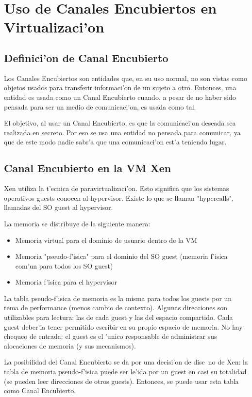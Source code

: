 \section{Uso de Canales Encubiertos en Virtualizaci'on}

\subsection{Definici'on de Canal Encubierto}

Los Canales Encubiertos son entidades que, en su uso normal, no son vistas como objetos usados para transferir informaci'on de un sujeto a otro. Entonces, una entidad es usada como un Canal Encubierto cuando, a pesar de no haber sido pensada para ser un medio de comunicaci'on, es usada como tal.

El objetivo, al usar un Canal Encubierto, es que la comunicaci'on deseada sea realizada en secreto. Por eso se usa una entidad no pensada para comunicar, ya que de este modo nadie sabr'a que una comunicaci'on est'a teniendo lugar.

\subsection{Canal Encubierto en la VM Xen}

Xen utiliza la t'ecnica de paravirtualizaci'on. Esto significa que los sistemas operativos guests conocen al hypervisor. Existe lo que se llaman "hypercalls", llamadas del SO guest al hypervisor.

La memoria se distribuye de la siguiente manera:
\begin{itemize}
	\item Memoria virtual para el dominio de usuario dentro de la VM
	\item Memoria "pseudo-f'isica" para el dominio del SO guest (memoria f'isica com'un para todos los SO guest)
	\item Memoria f'isica para el hypervisor
\end{itemize}

La tabla pseudo-f'isica de memoria es la misma para todos los guests por un tema de performance (menos cambio de contexto). Algunas direcciones son utilizables para lectura: las de cada guest y las del espacio compartido. Cada guest deber'ia tener permitido escribir en su propio espacio de memoria. No hay chequeo de entrada: el guest es el 'unico responsable de administrar sus alocaciones de memoria (y sus mecanismos).

La posibilidad del Canal Encubierto se da por una decisi'on de dise~no de Xen: la tabla de memoria pseudo-f'isica puede ser le'ida por un guest en casi su totalidad (se pueden leer direcciones de otros guests). Entonces, se puede usar esta tabla como Canal Encubierto.

